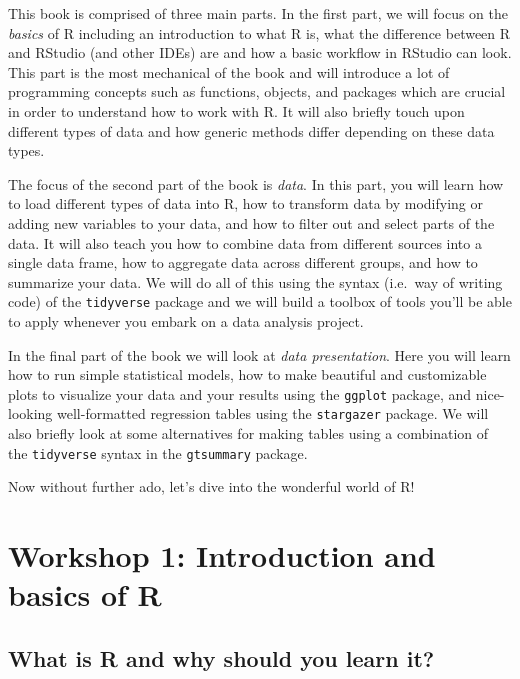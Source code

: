 \documentclass[
]{book}
\begin{document}
This book is comprised of three main parts. In the first part, we will focus on the \emph{basics} of R including an introduction to what R is, what the difference between R and RStudio (and other IDEs) are and how a basic workflow in RStudio can look. This part is the most mechanical of the book and will introduce a lot of programming concepts such as functions, objects, and packages which are crucial in order to understand how to work with R. It will also briefly touch upon different types of data and how generic methods differ depending on these data types.

The focus of the second part of the book is \emph{data}. In this part, you will learn how to load different types of data into R, how to transform data by modifying or adding new variables to your data, and how to filter out and select parts of the data. It will also teach you how to combine data from different sources into a single data frame, how to aggregate data across different groups, and how to summarize your data. We will do all of this using the syntax (i.e.~way of writing code) of the \texttt{tidyverse} package and we will build a toolbox of tools you'll be able to apply whenever you embark on a data analysis project.

In the final part of the book we will look at \emph{data presentation}. Here you will learn how to run simple statistical models, how to make beautiful and customizable plots to visualize your data and your results using the \texttt{ggplot} package, and nice-looking well-formatted regression tables using the \texttt{stargazer} package. We will also briefly look at some alternatives for making tables using a combination of the \texttt{tidyverse} syntax in the \texttt{gtsummary} package.

Now without further ado, let's dive into the wonderful world of R!

\hypertarget{part-workshop-1-introduction-and-basics-of-r}{%
\part{Workshop 1: Introduction and basics of R}\label{part-workshop-1-introduction-and-basics-of-r}}

\hypertarget{what-is-r-and-why-should-you-learn-it}{%
\chapter{What is R and why should you learn it?}\label{what-is-r-and-why-should-you-learn-it}}
\end{document}
